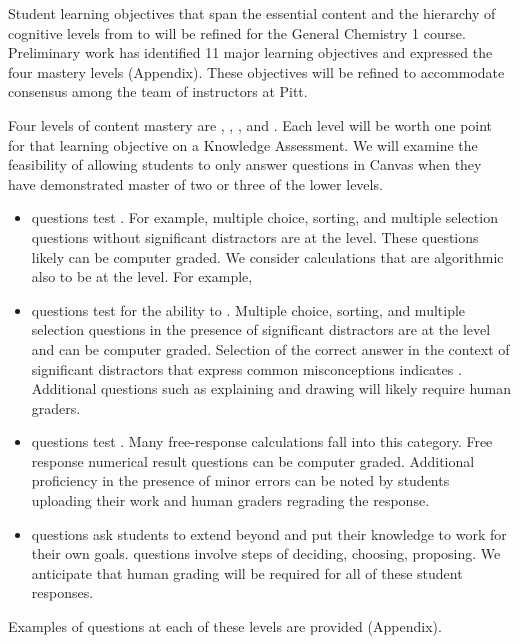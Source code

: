 \documentclass[10pt,letterpaper]{article}
\begin{document}
Student learning objectives that span the essential content and the hierarchy of cognitive levels from \recall to \use will be refined for the General Chemistry 1 course. Preliminary work has identified 11 major learning objectives and expressed the four mastery levels (Appendix). These objectives will be refined to accommodate consensus among the team of \pogil instructors at Pitt. 


 Four levels of content mastery are \recall, \comprehension, \analysis, and \use. Each level will be worth one point for that learning objective on a Knowledge Assessment. We will examine the feasibility of allowing students to only answer \use questions in Canvas when they have demonstrated master of two or three of the lower levels. 

\begin{itemize}
\item \Recall questions test . For example, multiple choice, sorting, and multiple selection questions without significant distractors are at the \recall level. These questions likely can be computer graded. We consider calculations that are algorithmic also to be at the \recall level. For example,  
\item \Comprehension questions test for the ability to . Multiple choice, sorting,  and multiple selection questions in the presence of  significant distractors are at the \comprehension level and can be computer graded. Selection of the correct answer in the context of significant distractors that express common misconceptions indicates \comprehension. Additional questions such as explaining and drawing will likely require human graders.
\item \Analysis questions test . Many free-response calculations fall into this category. Free response numerical result questions can be computer graded. Additional proficiency in the presence of minor errors can be noted by students uploading their work and human graders regrading the response.
\item \Use questions ask students to extend beyond \analysis and put their knowledge to work for their own goals. \Use questions involve steps of deciding, choosing, proposing. We anticipate that human grading will be required for all of these student responses.
\end{itemize}
Examples of questions at each of these levels are provided (Appendix).
%
\end{document}
